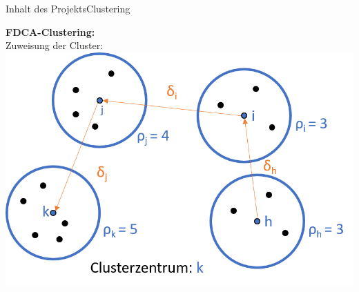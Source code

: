 \documentclass[12pt, xcolor={usenames,dvipsnames,svgnames,x11names,table}]{beamer}
\begin{document}
	\begin{frame}{Inhalt des Projekts}{Clustering}
	
		\textbf{FDCA-Clustering:}
		\\\bigskip
		Zuweisung der Cluster:
		\\\bigskip
		\center\includegraphics[scale=.6]{cluster_zuweisung}
		
	\end{frame}
	
\end{document}
